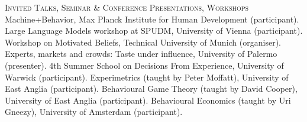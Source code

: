 \begin{rubric}{\textsc{Invited Talks, Seminar \& Conference Presentations, Workshops}}
\entry*[2024] Machine+Behavior, Max Planck Institute for Human Development (participant).
\entry*[2023] Large Language Models workshop at SPUDM, University of Vienna (participant).
\entry*[2023] Workshop on Motivated Beliefs, Technical University of Munich (organiser).
\entry*[2021] Experts, markets and crowds: Taste under influence, University of Palermo (presenter).
\entry*[2017] 4th Summer School on Decisions From Experience, University of Warwick (participant). 
\entry*[2015] Experimetrics (taught by Peter Moffatt), University of East Anglia (participant).
\entry*[2015] Behavioural Game Theory (taught by David Cooper), University of East Anglia (participant). 
\entry*[2012] Behavioural Economics (taught by Uri Gneezy), University of Amsterdam (participant).

\end{rubric}
